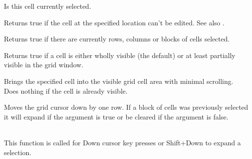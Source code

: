 Is this cell currently selected.



\label{wxgridisreadonly}


Returns true if the cell at the specified location can't be edited.
See also .



\label{wxgridisselection}


Returns true if there are currently rows, columns or blocks of cells selected.



\label{wxgridisvisible}



Returns true if a cell is either wholly visible (the default) or at least partially
visible in the grid window.



\label{wxgridmakecellvisible}



Brings the specified cell into the visible grid cell area with minimal scrolling. Does
nothing if the cell is already visible.



\label{wxgridmovecursordown}


Moves the grid cursor down by one row. If a block of cells was previously selected it
will expand if the argument is true or be cleared if the argument is false.

\\
This function is called for Down cursor key presses or Shift+Down to expand a selection.



